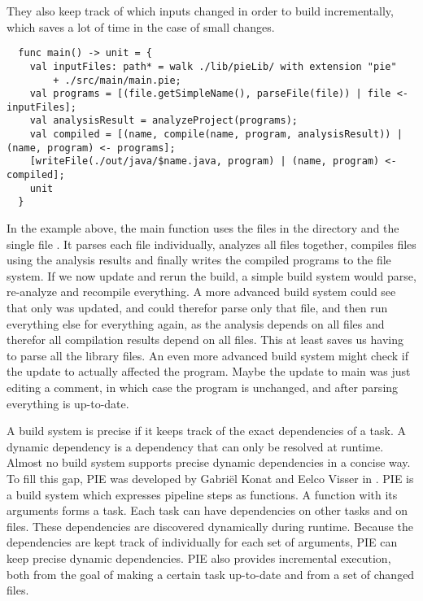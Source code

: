 They also keep track of which inputs changed in order to build incrementally, which saves a lot of time in the case of small changes.
\begin{lstlisting}
  func main() -> unit = {
    val inputFiles: path* = walk ./lib/pieLib/ with extension "pie"
        + ./src/main/main.pie;
    val programs = [(file.getSimpleName(), parseFile(file)) | file <- inputFiles];
    val analysisResult = analyzeProject(programs);
    val compiled = [(name, compile(name, program, analysisResult)) | (name, program) <- programs];
    [writeFile(./out/java/$name.java, program) | (name, program) <- compiled];
    unit
  }
\end{lstlisting}
In the example above, the main function uses the files in the directory  and the single file .
It parses each file individually, analyzes all files together, compiles files using the analysis results and finally writes the compiled programs to the file system.
If we now update  and rerun the build, a simple build system would parse, re-analyze and recompile everything.
A more advanced build system could see that only  was updated, and could therefor parse only that file, and then run everything else for everything again, as the analysis depends on all files and therefor all compilation results depend on all files.
This at least saves us having to parse all the library files.
An even more advanced build system might check if the update to  actually affected the program.
Maybe the update to main was just editing a comment, in which case the program is unchanged, and after parsing  everything is up-to-date.

A build system is precise if it keeps track of the exact dependencies of a task.
A dynamic dependency is a dependency that can only be resolved at runtime.
Almost no build system supports precise dynamic dependencies in a concise way.
To fill this gap, \ac{PIE} was developed by Gabriël Konat and Eelco Visser in \missingref. 
\Ac{PIE} is a build system which expresses pipeline steps as functions.
A function with its arguments forms a task.
Each task can have dependencies on other tasks and on files.
These dependencies are discovered dynamically during runtime.
Because the dependencies are kept track of individually for each set of arguments, \ac{PIE} can keep precise dynamic dependencies.
\Ac{PIE} also provides incremental execution, both from the goal of making a certain task up-to-date and from a set of changed files.


